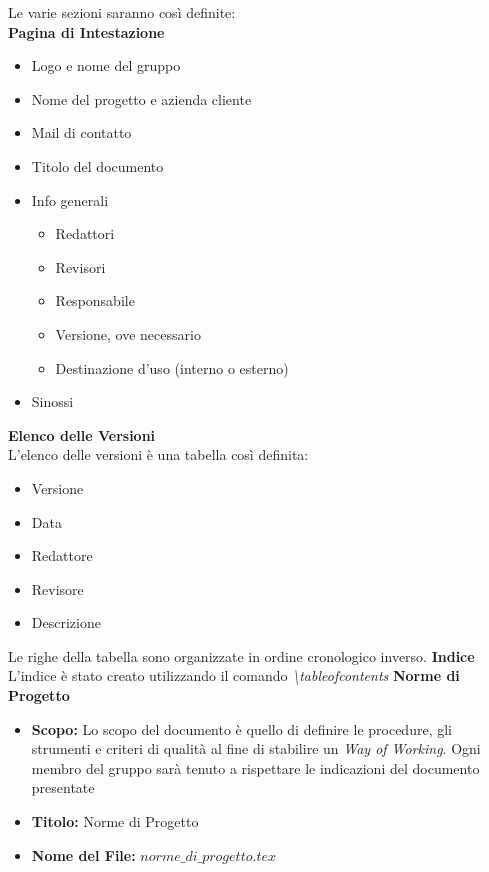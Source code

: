 \documentclass[a4paper, 12pt]{article}
\begin{document}
Le varie sezioni saranno così definite: \\

\textbf{Pagina di Intestazione} 
\begin{itemize}
    \item Logo e nome del gruppo
    \item Nome del progetto e azienda cliente
    \item Mail di contatto
    \item Titolo del documento
    \item Info generali
    \begin{itemize}
        \item Redattori
        \item Revisori
        \item Responsabile
        \item Versione, ove necessario
        \item Destinazione d'uso (interno o esterno)
    \end{itemize}
    \item Sinossi
\end{itemize}

\textbf{Elenco delle Versioni} \\
L'elenco delle versioni è una tabella così definita:
\begin{itemize}
    \item Versione
    \item Data
    \item Redattore
    \item Revisore
    \item Descrizione
\end{itemize}
Le righe della tabella sono organizzate in ordine cronologico inverso. 
\newline \newline
\textbf{Indice} \\
L'indice è stato creato utilizzando il comando \textit{\textbackslash tableofcontents}
\newline \newline
\textbf{Norme di Progetto}
\begin{itemize}
    \item \textbf{Scopo:} Lo scopo del documento è quello di definire le procedure, gli strumenti e criteri di qualità al fine di stabilire un \textit{Way of Working}. Ogni membro del gruppo sarà tenuto a rispettare le indicazioni del documento presentate
    \item \textbf{Titolo:} Norme di Progetto
    \item \textbf{Nome del File:} $norme\_di\_progetto.tex$
\end{itemize} 
\end{document}
